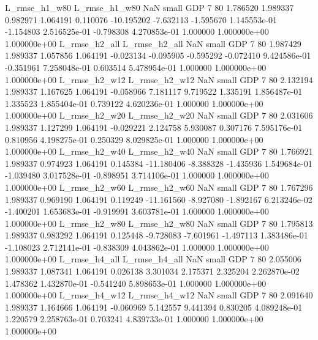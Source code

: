  L_rmse_h1_w80  L_rmse_h1_w80                   NaN      small      GDP                 7 80 1.786520       1.989337 0.982971       1.064191    0.110076    -10.195202     -7.632113    -1.595670   1.145553e-01 -1.154803 2.516525e-01    -0.798308   4.270853e-01            1.000000    1.000000e+00        1.000000e+00
 L_rmse_h2_all  L_rmse_h2_all                   NaN      small      GDP                 7 80 1.987429       1.989337 1.057856       1.064191   -0.023134     -0.095905     -0.595292    -0.072410   9.424586e-01 -0.351961 7.258048e-01     0.603514   5.478954e-01            1.000000    1.000000e+00        1.000000e+00
 L_rmse_h2_w12  L_rmse_h2_w12                   NaN      small      GDP                 7 80 2.132194       1.989337 1.167625       1.064191   -0.058966      7.181117      9.719522     1.335191   1.856487e-01  1.335523 1.855404e-01     0.739122   4.620236e-01            1.000000    1.000000e+00        1.000000e+00
 L_rmse_h2_w20  L_rmse_h2_w20                   NaN      small      GDP                 7 80 2.031606       1.989337 1.127299       1.064191   -0.029221      2.124758      5.930087     0.307176   7.595176e-01  0.810956 4.198275e-01     0.250329   8.029825e-01            1.000000    1.000000e+00        1.000000e+00
 L_rmse_h2_w40  L_rmse_h2_w40                   NaN      small      GDP                 7 80 1.766921       1.989337 0.974923       1.064191    0.145384    -11.180406     -8.388328    -1.435936   1.549684e-01 -1.039480 3.017528e-01    -0.898951   3.714106e-01            1.000000    1.000000e+00        1.000000e+00
 L_rmse_h2_w60  L_rmse_h2_w60                   NaN      small      GDP                 7 80 1.767296       1.989337 0.969190       1.064191    0.119249    -11.161560     -8.927080    -1.892167   6.213246e-02 -1.400201 1.653683e-01    -0.919991   3.603781e-01            1.000000    1.000000e+00        1.000000e+00
 L_rmse_h2_w80  L_rmse_h2_w80                   NaN      small      GDP                 7 80 1.795813       1.989337 0.983292       1.064191    0.125448     -9.728083     -7.601961    -1.497113   1.383486e-01 -1.108023 2.712141e-01    -0.838309   4.043862e-01            1.000000    1.000000e+00        1.000000e+00
 L_rmse_h4_all  L_rmse_h4_all                   NaN      small      GDP                 7 80 2.055006       1.989337 1.087341       1.064191    0.026138      3.301034      2.175371     2.325204   2.262870e-02  1.478362 1.432870e-01    -0.541240   5.898653e-01            1.000000    1.000000e+00        1.000000e+00
 L_rmse_h4_w12  L_rmse_h4_w12                   NaN      small      GDP                 7 80 2.091640       1.989337 1.164666       1.064191   -0.060969      5.142557      9.441394     0.830205   4.089248e-01  1.220579 2.258763e-01     0.703241   4.839733e-01            1.000000    1.000000e+00        1.000000e+00
